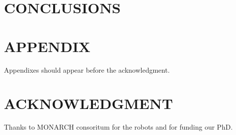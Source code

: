 \section{CONCLUSIONS}

\section*{APPENDIX}

Appendixes should appear before the acknowledgment.

\section*{ACKNOWLEDGMENT}

Thanks to MONARCH consoritum for the robots and for funding our PhD. 
